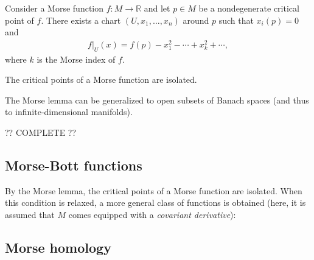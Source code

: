     \begin{property}
        Consider a Morse function $f:M\rightarrow\mathbb{R}$ and let $p\in M$ be a nondegenerate critical point of $f$. There exists a chart $(U,x_1,\ldots,x_n)$ around $p$ such that $x_i(p)=0$ and
        \begin{gather}
            f|_U(x) = f(p) - x_1^2-\cdots + x_k^2+\cdots,
        \end{gather}
        where $k$ is the Morse index of $f$.
    \end{property}
    \begin{result}
        The critical points of a Morse function are isolated.
    \end{result}
    \begin{remark}
        The Morse lemma can be generalized to open subsets of Banach spaces (and thus to infinite-dimensional manifolds).
    \end{remark}


    ?? COMPLETE ??

\subsection{Morse-Bott functions}

    By the Morse lemma, the critical points of a Morse function are isolated. When this condition is relaxed, a more general class of functions is obtained (here, it is assumed that $M$ comes equipped with a \textit{covariant derivative}):

\subsection{Morse homology}\label{section:morse_homology}

